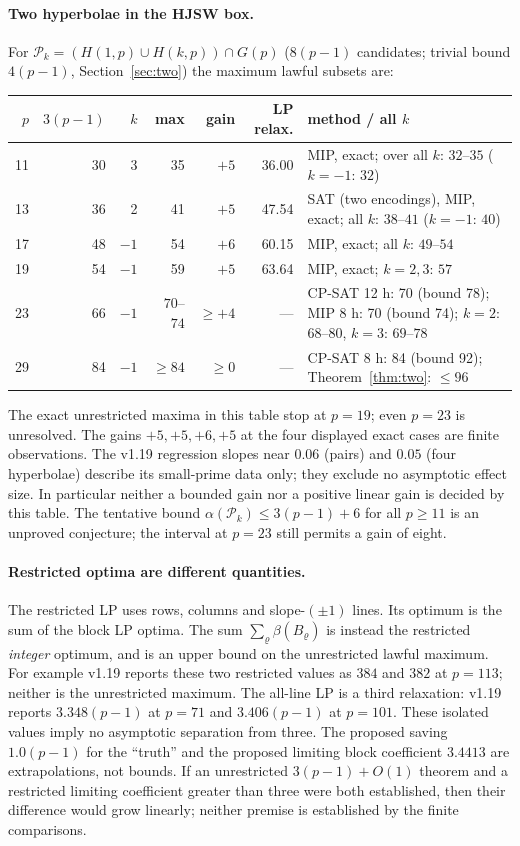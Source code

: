 \documentclass[11pt]{article}
\theoremstyle{remark}
\newcommand{\Gp}{G(p)}
\newcommand{\Pset}{\mathcal{P}}
\begin{document}
\paragraph{Two hyperbolae in the HJSW box.}  For $\Pset_k=(H(1,p)\cup H(k,p))\cap\Gp$ ($8(p-1)$ candidates; trivial bound $4(p-1)$,
Section~\ref{sec:two}) the maximum lawful subsets are:
\begin{center}\footnotesize
\begin{tabular}{rrrrrrp{6.6cm}}
\toprule
$p$ & $3(p-1)$ & $k$ & max & gain & LP relax. & method / all $k$\\
\midrule
11 & 30 & 3 & 35 & $+5$ & 36.00 & MIP, exact; over all $k$: $32$--$35$ ($k=-1$: $32$)\\
13 & 36 & 2 & 41 & $+5$ & 47.54 & SAT (two encodings), MIP, exact; all $k$: $38$--$41$ ($k=-1$: $40$)\\
17 & 48 & $-1$ & 54 & $+6$ & 60.15 & MIP, exact; all $k$: $49$--$54$\\
19 & 54 & $-1$ & 59 & $+5$ & 63.64 & MIP, exact; $k=2,3$: $57$\\
23 & 66 & $-1$ & $70$--$74$ & $\ge+4$ & --- & CP-SAT 12 h: 70 (bound 78); MIP 8 h: 70 (bound 74); $k=2$: $68$--$80$, $k=3$: $69$--$78$\\
29 & 84 & $-1$ & $\ge84$ & $\ge0$ & --- & CP-SAT 8 h: 84 (bound 92); Theorem~\ref{thm:two}: $\le96$\\
\bottomrule
\end{tabular}
\end{center}
The exact unrestricted maxima in this table stop at $p=19$; even $p=23$ is unresolved.
The gains $+5,+5,+6,+5$ at the four displayed exact cases are finite observations.
The v1.19 regression slopes near $0.06$ (pairs) and $0.05$ (four hyperbolae) describe its small-prime data only;
they exclude no asymptotic effect size.  In particular neither a bounded gain nor a positive linear gain is decided by this table.
The tentative bound $\alpha(\Pset_k)\le3(p-1)+6$ for all $p\ge11$ is an unproved conjecture; the interval at $p=23$ still permits a gain of eight.

\paragraph{Restricted optima are different quantities.}
The restricted LP uses rows, columns and slope-$(\pm1)$ lines.  Its optimum is the sum of the block LP optima.
The sum $\sum_\varrho\beta(B_\varrho)$ is instead the restricted \emph{integer} optimum, and is an upper bound on the unrestricted lawful maximum.
For example v1.19 reports these two restricted values as $384$ and $382$ at $p=113$; neither is the unrestricted maximum.
The all-line LP is a third relaxation: v1.19 reports $3.348(p-1)$ at $p=71$ and $3.406(p-1)$ at $p=101$.
These isolated values imply no asymptotic separation from three.
The proposed saving $1.0(p-1)$ for the ``truth'' and the proposed limiting block coefficient $3.4413$ are extrapolations, not bounds.
If an unrestricted $3(p-1)+O(1)$ theorem and a restricted limiting coefficient greater than three were both established,
then their difference would grow linearly; neither premise is established by the finite comparisons.
\end{document}
